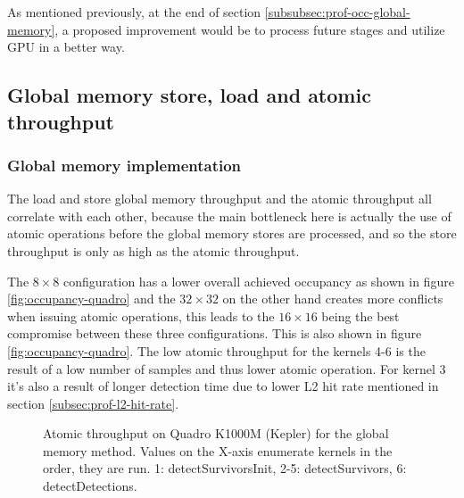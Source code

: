 As mentioned previously, at the end of section \ref{subsubsec:prof-occ-global-memory}, a proposed improvement would be to process future stages and utilize GPU in a better way.

\subsection{Global memory store, load and atomic throughput}\label{subsec:prof-throughput}

\subsubsection{Global memory implementation}\label{subsubsec:prof-thr-global-memory}

The load and store global memory throughput and the atomic throughput all correlate with each other, because the main bottleneck here is actually the use of atomic operations before the global memory stores are processed, and so the store throughput is only as high as the atomic throughput.

The $8 \times 8$ configuration has a lower overall achieved occupancy as shown in figure \ref{fig:occupancy-quadro} and the $32 \times 32$ on the other hand creates more conflicts when issuing atomic operations, this leads to the $16 \times 16$ being the best compromise between these three configurations. This is also shown in figure \ref{fig:occupancy-quadro}. The low atomic throughput for the kernels 4-6 is the result of a low number of samples and thus lower atomic operation. For kernel 3 it's also a result of longer detection time due to lower L2 hit rate mentioned in section \ref{subsec:prof-l2-hit-rate}.

\begin{figure}[ht]
\centering{}
	\caption{Atomic throughput on Quadro K1000M (Kepler) for the global memory method. Values on the X-axis enumerate kernels in the order, they are run. 1: detectSurvivorsInit, 2-5: detectSurvivors, 6: detectDetections.}
	\label{fig:atomic-throughput-quadro}
\end{figure}

